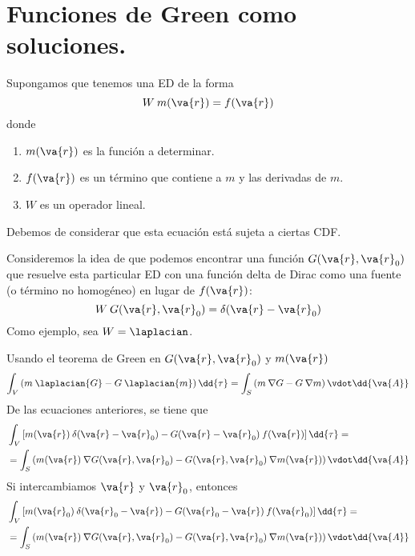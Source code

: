 \section{Funciones de Green como soluciones.}\label{sec:FuncionesdeGreen}
Supongamos que tenemos una ED de la forma
\begin{equation}
W \: m(\va{r}) =  f(\va{r})
\label{eq:ecuacion_03}
\end{equation}
donde\begin{enumerate}
\item $m(\va{r})$ es la función a determinar.
\item $f(\va{r})$ es un término que contiene a $m$ y las derivadas de $m$.
\item $W$ es un operador lineal.
\end{enumerate}
Debemos de considerar que esta ecuación está sujeta a ciertas CDF.
\par
Consideremos la idea de que podemos encontrar una función $G(\va{r}, \va{r}_{0})$ que resuelve esta particular ED con una función delta de Dirac como una fuente (o término no homogéneo) en lugar de $f(\va{r})$:
\begin{equation}
W \: G(\va{r}, \va{r}_{0}) = \delta (\va{r} - \va{r}_{0})
\label{eq:ecuacion_04}
\end{equation}
Como ejemplo, sea $W = \laplacian$.
\par
Usando el teorema de Green en $G(\va{r}, \va{r}_{0})$ y $m(\va{r})$
\begin{equation}
\int_{V} \left( m \: \laplacian{G} - G \: \laplacian{m} \right) \dd{\tau} = \int_{S} \left( m \: \nabla G - G \: \nabla m \right) \vdot \dd{\va{A}}
\label{eq:ecuacion_05}
\end{equation}
De las ecuaciones anteriores, se tiene que
\begin{align}
&\int_{V} \left[ m(\va{r}) \: \delta(\va{r} - \va{r}_{0}) - G (\va{r} - \va{r}_{0}) \: f(\va{r}) \right] \dd{\tau} = \label{eq:ecuacion_06} \\
&= \int_{S} \left( m(\va{r}) \: \nabla G(\va{r}, \va{r}_{0}) - G(\va{r}, \va{r}_{0}) \: \nabla m(\va{r}) \right) \vdot \dd{\va{A}} \label{eq:ecuacion_07}
\end{align}
Si intercambiamos $\va{r}$ y $\va{r}_{0}$, entonces
\begin{align}
&\int_{V} \left[ m(\va{r}_{0}) \: \delta(\va{r}_{0} - \va{r}) - G (\va{r}_{0} - \va{r}) \: f(\va{r}_{0}) \right] \dd{\tau} = \label{eq:ecuacion_08} \\
&= \int_{S} \left( m(\va{r}) \: \nabla G(\va{r}, \va{r}_{0}) - G(\va{r}, \va{r}_{0}) \: \nabla m(\va{r}) \right) \vdot \dd{\va{A}} \label{eq:ecuacion_09}
\end{align}
